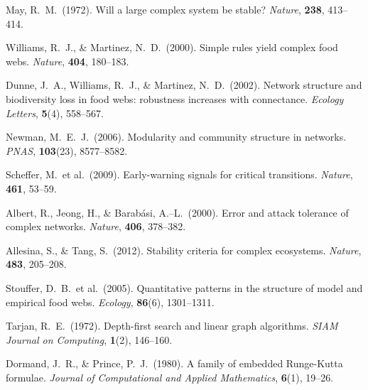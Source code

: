 \documentclass[12pt, a4paper]{article}
\begin{document}
\begin{enumerate}[label={[\arabic*]}, leftmargin=*, noitemsep]
    \item May, R.\ M.\ (1972). Will a large complex system be stable?
          \textit{Nature}, \textbf{238}, 413--414.

    \item Williams, R.\ J., \& Martinez, N.\ D.\ (2000). Simple rules yield
          complex food webs. \textit{Nature}, \textbf{404}, 180--183.

    \item Dunne, J.\ A., Williams, R.\ J., \& Martinez, N.\ D.\ (2002).
          Network structure and biodiversity loss in food webs: robustness increases
          with connectance. \textit{Ecology Letters}, \textbf{5}(4), 558--567.

    \item Newman, M.\ E.\ J.\ (2006). Modularity and community structure in networks.
          \textit{PNAS}, \textbf{103}(23), 8577--8582.

    \item Scheffer, M.\ et al.\ (2009). Early-warning signals for critical transitions.
          \textit{Nature}, \textbf{461}, 53--59.

    \item Albert, R., Jeong, H., \& Barabási, A.--L.\ (2000). Error and attack
          tolerance of complex networks. \textit{Nature}, \textbf{406}, 378--382.

    \item Allesina, S., \& Tang, S.\ (2012). Stability criteria for complex ecosystems.
          \textit{Nature}, \textbf{483}, 205--208.

    \item Stouffer, D.\ B.\ et al.\ (2005). Quantitative patterns in the structure of
          model and empirical food webs. \textit{Ecology}, \textbf{86}(6), 1301--1311.

    \item Tarjan, R.\ E.\ (1972). Depth-first search and linear graph algorithms.
          \textit{SIAM Journal on Computing}, \textbf{1}(2), 146--160.

    \item Dormand, J.\ R., \& Prince, P.\ J.\ (1980). A family of embedded
          Runge-Kutta formulae. \textit{Journal of Computational and Applied
          Mathematics}, \textbf{6}(1), 19--26.
\end{enumerate}
\end{document}
